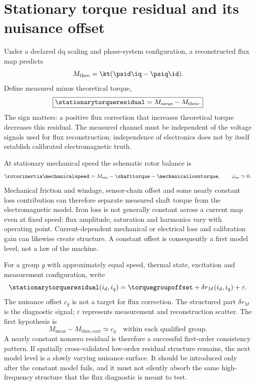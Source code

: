 \section{Stationary torque residual and its nuisance offset}
\label{sec:stationary-residual}
Under a declared dq scaling and phase-system configuration, a reconstructed
flux map predicts
\begin{equation}
 M_{\mathrm{theo}}=\kt(\psid\iq-\psiq\id).
 \label{eq:theoretical-torque}
\end{equation}
Define measured minus theoretical torque,
\begin{equation}
 \boxed{\stationarytorqueresidual=M_{\mathrm{meas}}-M_{\mathrm{theo}}.}
 \label{eq:stationary-residual}
\end{equation}
The sign matters: a positive flux correction that increases theoretical torque
decreases this residual. The measured channel must be independent of the voltage
signals used for flux reconstruction; independence of electronics does not by
itself establish calibrated electromagnetic truth.

At stationary mechanical speed the schematic rotor balance is
\begin{equation}
 \rotorinertia\dot{\mechanicalspeed}
 =M_{\mathrm{em}}-\shafttorque-\mechanicallosstorque,
 \qquad \dot\omega_{\mathrm m}\simeq0.
 \label{eq:stationary-balance}
\end{equation}
Mechanical friction and windage, sensor-chain offset and some nearly constant
loss contribution can therefore separate measured shaft torque from the
electromagnetic model. Iron loss is not generally constant across a current
map even at fixed speed: flux amplitude, saturation and harmonics vary with
operating point. Current-dependent mechanical or electrical loss and calibration
gain can likewise create structure. A constant offset is consequently a first
model level, not a law of the machine.

For a group $g$ with approximately equal speed, thermal state, excitation and
measurement configuration, write
\begin{equation}
 \stationarytorqueresidual(i_d,i_q)
 =\torquegroupoffset+\delta r_M(i_d,i_q)+\varepsilon.
 \label{eq:residual-decomposition}
\end{equation}
The nuisance offset $c_g$ is not a target for flux correction. The structured
part $\delta r_M$ is the diagnostic signal; $\varepsilon$ represents measurement
and reconstruction scatter. The first hypothesis is
\begin{equation}
 \boxed{M_{\mathrm{meas}}-M_{\mathrm{theo,corr}}\simeq c_g
 \quad\text{within each qualified group}.}
 \label{eq:flat-residual-hypothesis}
\end{equation}
A nearly constant nonzero residual is therefore a successful first-order
consistency pattern. If spatially cross-validated low-order residual structure
remains, the next model level is a slowly varying nuisance surface. It should be
introduced only after the constant model fails, and it must not silently absorb
the same high-frequency structure that the flux diagnostic is meant to test.

